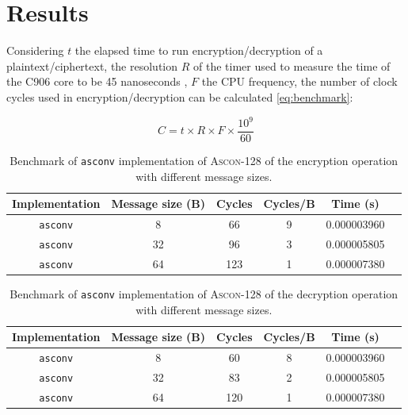\documentclass[11pt,twoside]{article}
\begin{document}
\section{Results}

Considering $t$ the elapsed time to run encryption/decryption of a plaintext/ciphertext, the resolution $R$ of the timer used to measure the time of the C906 core to be 45 nanoseconds  \cite{10179399}, $F$ the CPU frequency, the number of clock cycles used in encryption/decryption can be calculated \cref{eq:benchmark}:

\begin{equation}
  C = t \times R \times F \times \frac{10^{9}}{60} \label{eq:benchmark}
\end{equation}

\begin{table}[h]
  \centering
  \begin{tabular}{|c|c|c|c|c|c|}
    \hline
    \textbf{Implementation} & \textbf{Message size (B)} &
    \textbf{Cycles}         & \textbf{Cycles/B}         & \textbf{Time (s)}                   \\ \hline

    \texttt{asconv}         & 8                         & 66                & 9 & 0.000003960 \\ \hline

    \texttt{asconv}         & 32                        & 96                & 3 & 0.000005805 \\ \hline

    \texttt{asconv}         & 64                        & 123               & 1 & 0.000007380 \\ \hline
  \end{tabular}
  \caption{Benchmark of \texttt{asconv} implementation of \textsc{Ascon-128} of the encryption operation with different message sizes.}
\end{table}

\begin{table}[h]
  \centering
  \begin{tabular}{|c|c|c|c|c|c|}
    \hline
    \textbf{Implementation} & \textbf{Message size (B)} &
    \textbf{Cycles}         & \textbf{Cycles/B}         & \textbf{Time (s)}                   \\ \hline

    \texttt{asconv}         & 8                         & 60                & 8 & 0.000003960 \\ \hline

    \texttt{asconv}         & 32                        & 83                & 2 & 0.000005805 \\ \hline

    \texttt{asconv}         & 64                        & 120               & 1 & 0.000007380 \\ \hline
  \end{tabular}
  \caption{Benchmark of \texttt{asconv} implementation of \textsc{Ascon-128} of the decryption operation with different message sizes.}
\end{table}
\end{document}
